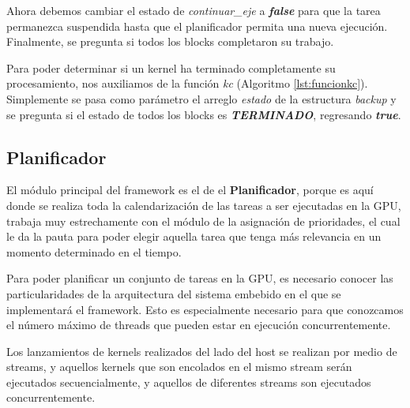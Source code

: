 Ahora debemos cambiar el estado de \textit{continuar\_eje} a \textbf{\textit{false}} para que la tarea permanezca suspendida hasta que el planificador permita una nueva ejecución. Finalmente, se pregunta si todos los blocks completaron su trabajo.



Para poder determinar si un kernel ha terminado completamente su procesamiento, nos auxiliamos de la función \textit{kc} (Algoritmo \ref{lst:funcionkc}). Simplemente se pasa como parámetro el arreglo \textit{estado} de la estructura \textit{backup} y se pregunta si el estado de todos los blocks es \textit{\textbf{TERMINADO}}, regresando \textbf{\textit{true}}.




\subsection{Planificador} \label{secc:planificador}

El módulo principal del framework es el de el \textbf{Planificador}, porque es aquí donde se realiza toda la calendarización de las tareas a ser ejecutadas en la GPU, trabaja muy estrechamente con el módulo de la asignación de prioridades, el cual le da la pauta para poder elegir aquella tarea que tenga más relevancia en un momento determinado en el tiempo. 
\newline

Para poder planificar un conjunto de tareas en la GPU, es necesario conocer las particularidades de la arquitectura del sistema embebido en el que se implementará el framework. Esto es especialmente necesario para que conozcamos el número máximo de threads que pueden estar en ejecución concurrentemente.
\newline

Los lanzamientos de kernels realizados del lado del host se realizan por medio de streams, y aquellos kernels que son encolados en el mismo stream serán ejecutados secuencialmente, y aquellos de diferentes streams son ejecutados concurrentemente.
\newline

